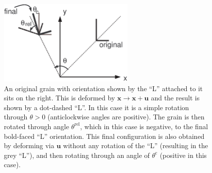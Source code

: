 \documentclass[]{scrreprt}
\newcommand{\thetac}{\theta^{\mathrm{c}}}
\newcommand{\thetarel}{\theta^{\mathrm{rel}}}
\begin{document}
\begin{figure}[htb]
\begin{center}
\includegraphics[width=0.6\textwidth]{deformation_cosserat.eps}
\caption{An original grain with orientation shown by the ``L''
  attached to it sits on the right.  This is deformed by ${\mathbf
  x}\rightarrow {\mathbf x}+{\mathbf u}$ and the result is shown by a
  dot-dashed ``L''.  In this case it is a simple rotation through
  $\theta>0$ (anticlockwise angles are positive).  The grain is then
  rotated through angle $\thetarel$, which in this case is negative, to
  the final bold-faced ``L'' orientation.  This final configuration is
  also obtained by deforming via ${\mathbf u}$ without any rotation of
  the ``L'' (resulting in the grey ``L''), and then rotating through
  an angle of $\thetac$ (positive in this case).}
\label{deformation_cosserat.fig}
\end{center}
\end{figure}
\end{document}
